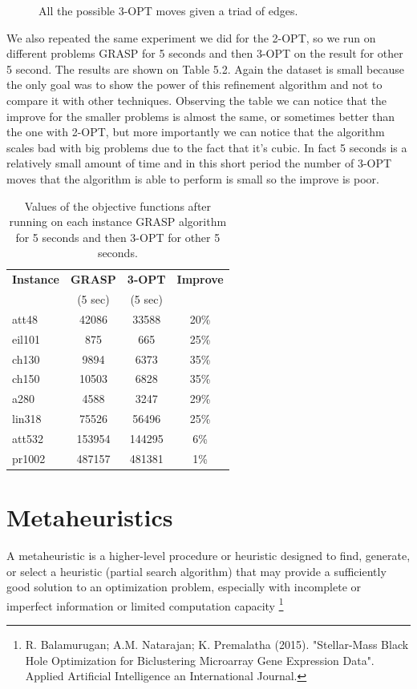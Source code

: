 \begin{figure}[h!]
\begin{subfigure}[b]{0.24\linewidth}
    \caption{}
  \end{subfigure}
  \caption{All the possible 3-OPT moves given a triad of edges.}
\end{figure}
 
\noindent We also repeated the same experiment we did for the 2-OPT, so we run on different problems GRASP for 5 seconds and then 3-OPT on the result for other 5 second. The results are shown on Table 5.2. Again the dataset is small because the only goal was to show the power of this refinement algorithm and not to compare it with other techniques. Observing the table we can notice that the improve for the smaller problems is almost the same, or sometimes better than the one with 2-OPT, but more importantly we can notice that the algorithm scales bad with big problems due to the fact that it's cubic. In fact 5 seconds is a relatively small amount of time and in this short period the number of 3-OPT moves that the algorithm is able to perform is small so the improve is poor.

\begin{table}[h!]
	\begin{center}
		\begin{tabular}{l|c|c|c}
			\textbf{Instance} & \textbf{GRASP} & \textbf{3-OPT} & \textbf{Improve}	\\
			& (5 sec) & (5 sec) & \\
			\hline
			att48 & 42086 & 33588 & 20\% \\
			eil101 & 875 & 665 & 25\% \\
			ch130 & 9894 & 6373 & 35\% \\
			ch150 & 10503 & 6828 & 35\% \\
			a280 & 4588 & 3247 & 29\% \\
			lin318 & 75526 & 56496 & 25\% \\ 
			att532 & 153954 & 144295 & 6\% \\	
			pr1002 & 487157 & 481381 & 1\% \\
		\end{tabular}
		\caption{Values of the objective functions after running on each instance GRASP algorithm for 5 seconds and then 3-OPT for other 5 seconds.}
	\end{center}
\end{table}

\newpage

\section{Metaheuristics}
A metaheuristic is a higher-level procedure or heuristic designed to find, generate, or select a heuristic (partial search algorithm) that may provide a sufficiently good solution to an optimization problem, especially with incomplete or imperfect information or limited computation capacity \footnote{R. Balamurugan; A.M. Natarajan; K. Premalatha (2015). "Stellar-Mass Black Hole Optimization for Biclustering Microarray Gene Expression Data". Applied Artificial Intelligence an International Journal.}


